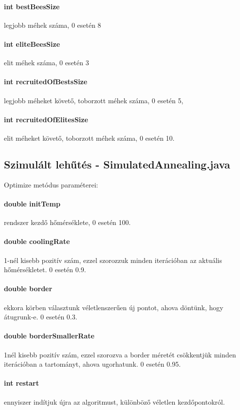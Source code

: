\paragraph{int bestBeesSize} legjobb méhek száma, 0 esetén 8
\paragraph{int eliteBeesSize} elit méhek száma, 0 esetén 3
\paragraph{int recruitedOfBestsSize} legjobb méheket követő, toborzott méhek száma, 0 esetén 5,
\paragraph{int recruitedOfElitesSize} elit méheket követő, toborzott méhek száma, 0 esetén 10.

\subsection{Szimulált lehűtés - SimulatedAnnealing.java}

Optimize metódus paraméterei:
\paragraph{double initTemp} rendszer kezdő hőmérséklete, 0 esetén 100.
\paragraph{double coolingRate} 1-nél kisebb pozitív szám, ezzel szorozzuk minden iterációban az aktuális hőmérsékletet. 0 esetén 0.9.
\paragraph{double border} ekkora körben választunk véletlenszerűen új pontot, ahova döntünk, hogy átugrunk-e. 0 esetén 0.3. 
\paragraph{double borderSmallerRate} 1nél kisebb pozitív szám, ezzel szorozva a border méretét csökkentjük minden iterációban a tartományt, ahova ugorhatunk. 0 esetén 0.95.
\paragraph{int restart} ennyiszer indítjuk újra az algoritmust, különböző véletlen kezdőpontokról.

